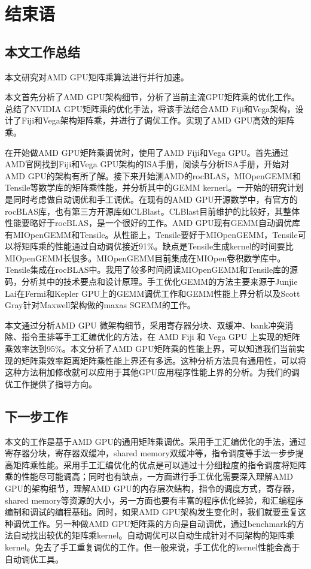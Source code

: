 \chapter{结束语}\label{chap:Conclusion}

\section{本文工作总结}
本文研究对AMD GPU矩阵乘算法进行并行加速。 

本文首先分析了AMD GPU架构细节，分析了当前主流GPU矩阵乘的优化工作。总结了NVIDIA GPU矩阵乘的优化手法，将该手法结合AMD Fiji和Vega架构，设计了Fiji和Vega架构矩阵乘，并进行了调优工作。实现了AMD GPU高效的矩阵乘。

在开始做AMD GPU矩阵乘调优时，使用了AMD Fiji和Vega GPU。首先通过AMD官网找到Fiji和Vega GPU架构的ISA手册，阅读与分析ISA手册，开始对AMD GPU的架构有所了解。接下来开始测AMD的rocBLAS，MIOpenGEMM和Tensile等数学库的矩阵乘性能，并分析其中的GEMM kernerl。一开始的研究计划是同时考虑做自动调优和手工调优。在现有的AMD GPU开源数学中，有官方的rocBLAS库，也有第三方开源库如CLBlast。CLBlast目前维护的比较好，其整体性能要略好于rocBLAS，是一个很好的工作。AMD GPU现有GEMM自动调优库有MIOpenGEMM和Tensile。从性能上，Tensile要好于MIOpenGEMM，Tensile可以将矩阵乘的性能通过自动调优接近91\%。缺点是Tensile生成kernel的时间要比MIOpenGEMM长很多。MIOpenGEMM目前集成在MIOpen卷积数学库中。Tensile集成在rocBLAS中。我用了较多时间阅读MIOpenGEMM和Tensile库的源码，分析其中的技术要点和设计原理。手工优化GEMM的方法主要来源于Junjie Lai在Fermi和Kepler GPU上的GEMM调优工作和GEMM性能上界分析以及Scott Gray针对Maxwell架构做的maxas SGEMM的工作。

本文通过分析AMD GPU 微架构细节，采用寄存器分块、双缓冲、bank冲突消除、指令重排等手工汇编优化的方法，在 AMD Fiji 和 Vega GPU 上实现的矩阵乘效率达到95\%。本文分析了AMD GPU矩阵乘的性能上界，可以知道我们当前实现的矩阵乘效率距离矩阵乘性能上界还有多远。这种分析方法具有通用性，可以将这种方法稍加修改就可以应用于其他GPU应用程序性能上界的分析。为我们的调优工作提供了指导方向。

\section{下一步工作}
本文的工作是基于AMD GPU的通用矩阵乘调优。采用手工汇编优化的手法，通过寄存器分块，寄存器双缓冲，shared memory双缓冲等，指令调度等手法一步步提高矩阵乘性能。采用手工汇编优化的优点是可以通过十分细粒度的指令调度将矩阵乘的性能尽可能调高；同时也有缺点，一方面进行手工优化需要深入理解AMD GPU的架构细节，理解AMD GPU的内存层次结构，指令的调度方式，寄存器，shared memory等资源的大小，另一方面也要有丰富的程序优化经验，和汇编程序编制和调试的编程基础。同时，如果AMD GPU架构发生变化时，我们就要重复这种调优工作。另一种做AMD GPU矩阵乘的方向是自动调优，通过benchmark的方法自动找出较优的矩阵乘kernel。自动调优可以自动生成针对不同架构的矩阵乘kernel。免去了手工重复调优的工作。但一般来说，手工优化的kernel性能会高于自动调优工具。


